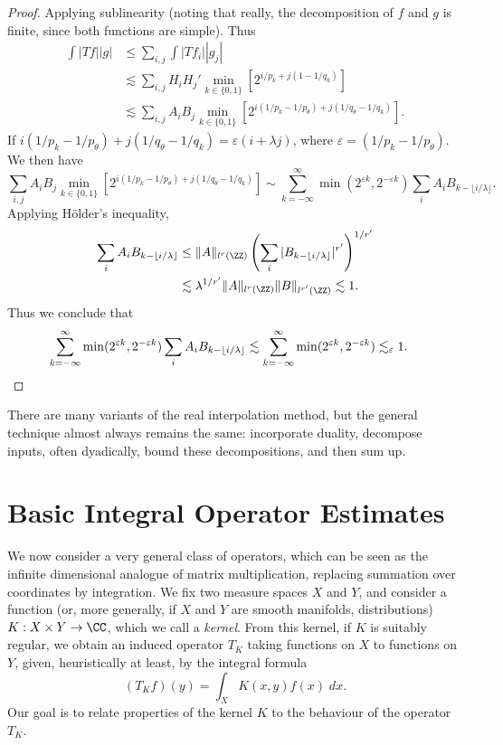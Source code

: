 \begin{proof}
  Applying sublinearity (noting that really, the decomposition of $f$ and $g$ is finite, since both functions are simple). Thus
  \begin{align*}
    \int |Tf| |g| &\leq \sum_{i,j} \int |Tf_i| |g_j|\\
    &\lesssim \sum_{i,j} H_i H_j' \min_{k \in \{0,1\}} \left[ 2^{i/p_k + j(1 - 1/q_k)} \right]\\
    &\lesssim \sum_{i,j} A_i B_j \min_{k \in \{ 0, 1 \}} \left[ 2^{i(1/p_k - 1/p_\theta) + j(1/q_\theta - 1/q_k)} \right].
  \end{align*}
  If $i(1/p_k - 1/p_\theta) + j(1/q_\theta - 1/q_k) = \varepsilon(i + \lambda j)$, where $\varepsilon = (1/p_k - 1/p_\theta)$. We then have
  \[ \sum_{i,j} A_i B_j \min_{k \in \{ 0, 1 \}} \left[ 2^{i(1/p_k - 1/p_\theta) + j(1/q_\theta - 1/q_k)} \right] \sim \sum_{k = -\infty}^\infty \min(2^{\varepsilon k}, 2^{-\varepsilon k}) \sum_i A_i B_{k - \lfloor i/\lambda \rfloor}. \]
  Applying H\"{o}lder's inequality,
  \begin{align*}
    \sum_i A_i B_{k - \lfloor i/\lambda \rfloor} &\leq \| A \|_{l^r(\ZZ)} \left( \sum_i |B_{k - \lfloor i/\lambda \rfloor}|^{r'} \right)^{1/r'}\\
    &\lesssim \lambda^{1/r'} \| A \|_{l^r(\ZZ)} \| B \|_{l^{r'}(\ZZ)} \lesssim 1.
  \end{align*}
  Thus we conclude that
  \begin{align*}
    \sum_{k = -\infty}^\infty \min(2^{\varepsilon k}, 2^{-\varepsilon k}) \sum_i A_i B_{k - \lfloor i/\lambda \rfloor} &\lesssim \sum_{k = -\infty}^\infty \min(2^{\varepsilon k}, 2^{-\varepsilon k}) \lesssim_\varepsilon 1. \qedhere
  \end{align*}
\end{proof}

There are many variants of the real interpolation method, but the general technique almost always remains the same: incorporate duality, decompose inputs, often dyadically, bound these decompositions, and then sum up.










\chapter{Basic Integral Operator Estimates}

We now consider a very general class of operators, which can be seen as the infinite dimensional analogue of matrix multiplication, replacing summation over coordinates by integration. We fix two measure spaces $X$ and $Y$, and consider a function (or, more generally, if $X$ and $Y$ are smooth manifolds, distributions) $K: X \times Y \to \CC$, which we call a \emph{kernel}. From this kernel, if $K$ is suitably regular, we obtain an induced operator $T_K$ taking functions on $X$ to functions on $Y$, given, heuristically at least, by the integral formula
%
\[ (T_K f)(y) = \int_X K(x,y) f(x)\; dx. \]
%
Our goal is to relate properties of the kernel $K$ to the behaviour of the operator $T_K$.

